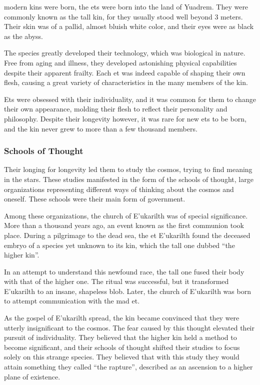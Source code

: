\begin{linenumbers}
modern kins were born, the ets were born into the land of Yuadrem.
They were commonly known as the tall kin, for they usually stood well beyond 3 meters.
Their skin was of a pallid, almost bluish white color, and their eyes were as black as the abyss.

The species greatly developed their technology, which was biological in nature.
Free from aging and illness, they developed astonishing physical capabilities despite their apparent frailty.
Each et was indeed capable of shaping their own flesh, causing a great variety of characteristics in the many members of the kin.

Ets were obsessed with their individuality, and it was common for them to change their own appearance, molding their flesh to reflect their personality and philosophy.
Despite their longevity however, it was rare for new ets to be born, and the kin never grew to more than a few thousand members.

\subsubsection{Schools of Thought}
Their longing for longevity led them to study the cosmos, trying to find meaning in the stars.
These studies manifested in the form of the schools of thought, large organizations representing different ways of thinking about the cosmos and oneself.
These schools were their main form of government.%

Among these organizations, the church of E'ukarilth was of special significance.
More than a thousand years ago, an event known as the first communion took place.
During a pilgrimage to the dead sea, the et E'ukarilth found the deceased embryo of a species yet unknown to its kin, which the tall one dubbed ``the higher kin''.

In an attempt to understand this newfound race, the tall one fused their body with that of the higher one.
The ritual was successful, but it transformed E'ukarilth to an insane, shapeless blob.
Later, the church of E'ukarilth was born to attempt communication with the mad et.

As the gospel of E'ukarilth spread, the kin became convinced that they were utterly insignificant to the cosmos.
The fear caused by this thought elevated their pursuit of individuality.
They believed that the higher kin held a method to become significant, and their schools of thought shifted their studies to focus solely on this strange species.
They believed that with this study they would attain something they called ``the rapture'', described as an ascension to a higher plane of existence.


\end{linenumbers}
